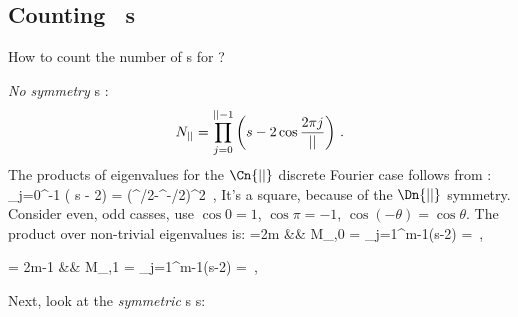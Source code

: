 \subsection{Counting \templatt\ {\lattstate}s}
\label{sect:LC21catCounts}    %


How to count the number of {\lattstate}s for \templatt?

\emph{No symmetry} {\lattstate}s \HillDet:
\[
N_{||} = \prod_{j=0}^{{||}-1} \left( s - 2\cos\frac{2\pi j}{{||}}\right)
\,.
\]
The products of eigenvalues for the $\Cn{\cl{}}$ discrete Fourier
case follows from :
\beq
\prod_{j=0}^{\cl{}-1} \left( s - 2\cos{}\right)
= (\ExpaEig^{\cl{}/2}-\ExpaEig^{-\cl{}/2})^2
\,,
It's a square, because of the  $\Dn{\cl{}}$ symmetry.
Consider even, odd casses, use $\cos0=1$, $\cos\pi=-1$,
$\cos(-\theta)=\cos\theta$. The product over non-trivial eigenvalues is:
\bea
\cl{}=2m
     &&
M_{\cl{},0} =
 \prod_{j=1}^{m-1}\left({s}-2\cos{}\right)
      =  
              {{\mu}}
\,,
\label{LC21:eigsProdEven}
\eea

\bea
\cl{}= 2m-1
     &&
M_{\cl{},1} =
 \prod_{j=1}^{m-1}\left({s}-2\cos{}\right)
     = 
              {{\mu}}
\,,
\label{LC21:eigsProdOdd}
\eea

Next, look at the \emph{symmetric} {\lattstate}s {\HillDet}s:

